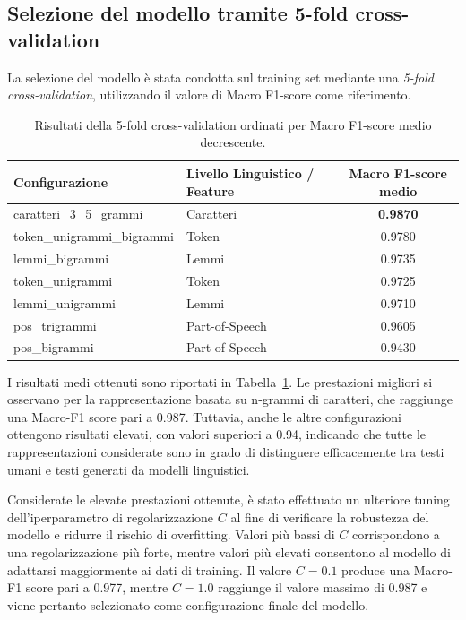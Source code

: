 \documentclass{article}
\begin{document}
\subsection{Selezione del modello tramite 5-fold cross-validation}

La selezione del modello è stata condotta sul training set mediante una \textit{5-fold cross-validation}, utilizzando il valore di Macro F1-score come riferimento.

\begin{table}[h]
\centering
\begin{tabular}{l l c}
\hline
\textbf{Configurazione} & \textbf{Livello Linguistico / Feature} & \textbf{Macro F1-score medio} \\
\hline
caratteri\_3\_5\_grammi & Caratteri & \textbf{0.9870} \\
token\_unigrammi\_bigrammi & Token & 0.9780 \\
lemmi\_bigrammi & Lemmi & 0.9735 \\
token\_unigrammi & Token & 0.9725 \\
lemmi\_unigrammi & Lemmi & 0.9710 \\
pos\_trigrammi & Part-of-Speech & 0.9605 \\
pos\_bigrammi & Part-of-Speech & 0.9430 \\
\hline
\end{tabular}
\caption{Risultati della 5-fold cross-validation ordinati per Macro F1-score medio decrescente.}
\label{tab:cv_results_svm}
\end{table}

I risultati medi ottenuti sono riportati in Tabella~\ref{tab:cv_results_svm}. Le prestazioni migliori si osservano per la rappresentazione basata su n-grammi di caratteri, che raggiunge una Macro-F1 score pari a 0.987. Tuttavia, anche le altre configurazioni ottengono risultati elevati, con valori superiori a 0.94, indicando che tutte le rappresentazioni considerate sono in grado di distinguere efficacemente tra testi umani e testi generati da modelli linguistici.

Considerate le elevate prestazioni ottenute, è stato effettuato un ulteriore tuning dell'iperparametro di regolarizzazione $C$ al fine di verificare la robustezza del modello e ridurre il rischio di overfitting. Valori più bassi di $C$ corrispondono a una regolarizzazione più forte, mentre valori più elevati consentono al modello di adattarsi maggiormente ai dati di training. Il valore $C = 0.1$ produce una Macro-F1 score pari a 0.977, mentre $C = 1.0$ raggiunge il valore massimo di 0.987 e viene pertanto selezionato come configurazione finale del modello.
\end{document}
